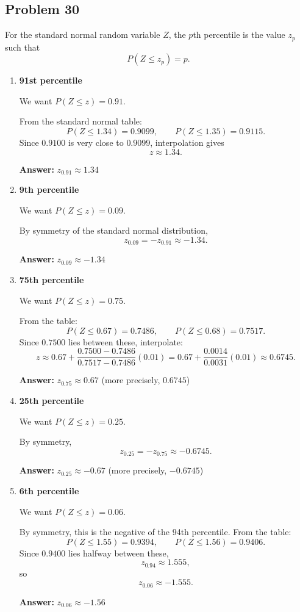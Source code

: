 \subsection*{Problem 30}

For the standard normal random variable $Z$, the $p$th percentile is the value $z_p$ such that
\[
P(Z \le z_p)=p.
\]

\begin{enumerate}
    \item[(a)] \textbf{91st percentile}

    We want $P(Z \le z)=0.91$.

    From the standard normal table:
    \[
    P(Z\le 1.34)=0.9099,\qquad P(Z\le 1.35)=0.9115.
    \]
    Since $0.9100$ is very close to $0.9099$, interpolation gives
    \[
    z \approx 1.34.
    \]

    \textbf{Answer:} $z_{0.91}\approx 1.34$

    \item[(b)] \textbf{9th percentile}

    We want $P(Z \le z)=0.09$.

    By symmetry of the standard normal distribution,
    \[
    z_{0.09}=-z_{0.91}\approx -1.34.
    \]

    \textbf{Answer:} $z_{0.09}\approx -1.34$

    \item[(c)] \textbf{75th percentile}

    We want $P(Z \le z)=0.75$.

    From the table:
    \[
    P(Z\le 0.67)=0.7486,\qquad P(Z\le 0.68)=0.7517.
    \]
    Since $0.7500$ lies between these, interpolate:
    \[
    z \approx 0.67+\frac{0.7500-0.7486}{0.7517-0.7486}(0.01)
    =0.67+\frac{0.0014}{0.0031}(0.01)
    \approx 0.6745.
    \]

    \textbf{Answer:} $z_{0.75}\approx 0.67$ (more precisely, $0.6745$)

    \item[(d)] \textbf{25th percentile}

    We want $P(Z \le z)=0.25$.

    By symmetry,
    \[
    z_{0.25}=-z_{0.75}\approx -0.6745.
    \]

    \textbf{Answer:} $z_{0.25}\approx -0.67$ (more precisely, $-0.6745$)

    \item[(e)] \textbf{6th percentile}

    We want $P(Z \le z)=0.06$.

    By symmetry, this is the negative of the 94th percentile. From the table:
    \[
    P(Z\le 1.55)=0.9394,\qquad P(Z\le 1.56)=0.9406.
    \]
    Since $0.9400$ lies halfway between these,
    \[
    z_{0.94}\approx 1.555,
    \]
    so
    \[
    z_{0.06}\approx -1.555.
    \]

    \textbf{Answer:} $z_{0.06}\approx -1.56$
\end{enumerate}

